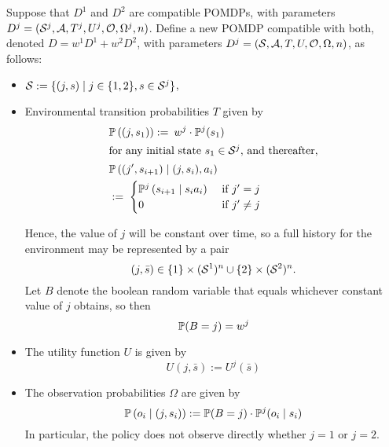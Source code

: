 \documentclass{article}
\newcommand{\seq}{\bar}
\newcommand{\bool}{B}
\begin{document}
\begin{definition}\label{defn:mixture} Suppose that $D^1$ and $D^2$ are compatible POMDPs, with parameters 
$D^j = (\mathcal{S}^j,\mathcal{A},T^j, U^j, \mathcal{O}, \Omega^j, n)$.  Define a new POMDP compatible with both, denoted $D=w^1D^1 + w^2D^2$, with parameters 
$D^j = (\mathcal{S},\mathcal{A},T, U, \mathcal{O}, \Omega, n)$, as follows:
\begin{itemize}
\item $\mathcal{S}:= \{(j,s) \mid j\in\{1,2\}, s\in\mathcal{S}^j\}$,
\item Environmental transition probabilities $T$ given by
%
\begin{align*}
& \mathbb{P}\left((j,s_1)\right) := \: w^j\cdot \mathbb{P}^j(s_1)\\
\intertext{for any initial state $s_1\in\mathcal{S}^j$, and thereafter,}
& \mathbb{P}\left((j',s_{i+1}) \mid (j,s_i), a_i \right) & \\
& := \;
\begin{cases}
\mathbb{P}^j\left(s_{i+1} \mid s_ia_i\right) &\mbox{ if $j'=j$}\\
0 & \mbox { if $j'\neq j$}
\end{cases}
\end{align*}

Hence, the value of $j$ will be constant over time, so a full history for the environment may be represented by a pair
\[
(j,\seq s) \in \{1\}\times (\Ss^1)^n \cup \{2\}\times(\Ss^2)^n.
\]
Let $\bool $ denote the boolean random variable that equals whichever constant value of $j$ obtains, so then
\[
\PP(\bool =j) = w^j
\]
\item The utility function $U$ is given by
\[
U(j,\seq s) := U^j(\seq s)
\]
\item The observation probabilities $\Omega$ are given by
\[
\PP\left(o_i \mid (j,s_i)\right) := \PP(\bool =j) \cdot \PP^j(o_i \mid s_i)
\]
In particular, the policy does not observe directly whether $j=1$ or $j=2$.
\end{itemize}

\end{definition}
\end{document}
